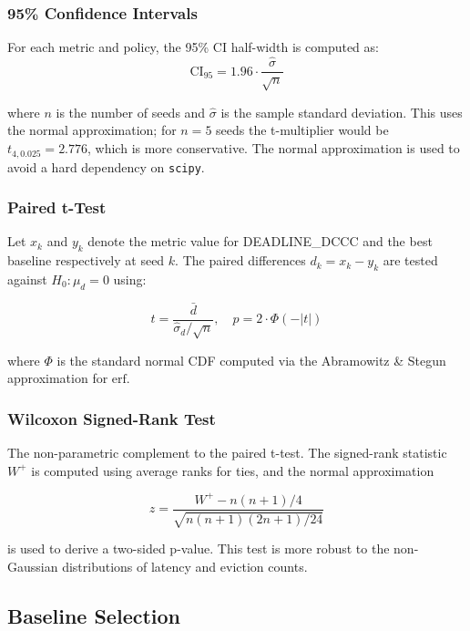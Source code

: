 \documentclass[12pt]{article}
\begin{document}
\subsubsection{95\% Confidence Intervals}

For each metric and policy, the 95\% CI half-width is computed as:
\begin{equation}
  \text{CI}_{95} = 1.96 \cdot \frac{\hat{\sigma}}{\sqrt{n}}
\end{equation}

where $n$ is the number of seeds and $\hat{\sigma}$ is the sample standard deviation. This uses the normal approximation; for $n = 5$ seeds the t-multiplier would be $t_{4, 0.025} = 2.776$, which is more conservative. The normal approximation is used to avoid a hard dependency on \texttt{scipy}.

\subsubsection{Paired t-Test}

Let $x_k$ and $y_k$ denote the metric value for DEADLINE\_DCCC and the best baseline respectively at seed $k$. The paired differences $d_k = x_k - y_k$ are tested against $H_0: \mu_d = 0$ using:

\begin{equation}
  t = \frac{\bar{d}}{\hat{\sigma}_d / \sqrt{n}}, \quad p = 2 \cdot \Phi(-|t|)
\end{equation}

where $\Phi$ is the standard normal CDF computed via the Abramowitz \& Stegun approximation for $\text{erf}$.

\subsubsection{Wilcoxon Signed-Rank Test}

The non-parametric complement to the paired t-test. The signed-rank statistic $W^+$ is computed using average ranks for ties, and the normal approximation

\begin{equation}
  z = \frac{W^+ - n(n+1)/4}{\sqrt{n(n+1)(2n+1)/24}}
\end{equation}

is used to derive a two-sided p-value. This test is more robust to the non-Gaussian distributions of latency and eviction counts.

\subsection{Baseline Selection}
\end{document}
